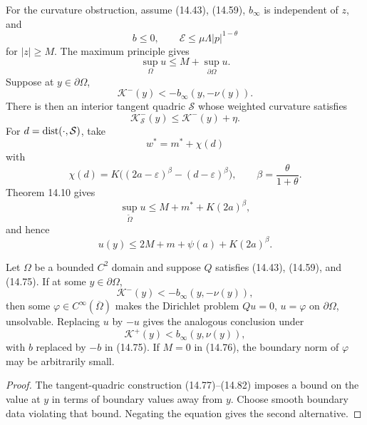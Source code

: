 For the curvature obstruction, assume (14.43), (14.59), $b_\infty$ is independent
of $z$, and
\begin{equation}
b\leq0,\qquad
\mathcal E\leq\mu\Lambda|p|^{1-\theta}
\tag{14.75}
\end{equation}
for $|z|\geq M$. The maximum principle gives
\begin{equation}
\sup_\Omega u\leq M+\sup_{\partial\Omega}u.
\tag{14.76}
\end{equation}
Suppose at $y\in\partial\Omega$,
\begin{equation}
\mathcal K^-(y)<-b_\infty(y,-\nu(y)).
\tag{14.77}
\end{equation}
There is then an interior tangent quadric $\mathcal S$ whose weighted curvature
satisfies
\begin{equation}
\mathcal K^-_{\mathcal S}(y)\leq\mathcal K^-(y)+\eta.
\tag{14.78}
\end{equation}
For $d=\operatorname{dist}(\cdot,\mathcal S)$, take
\begin{equation}
w^*=m^*+\chi(d)
\tag{14.79}
\end{equation}
with
\begin{equation}
\chi(d)=K\bigl((2a-\varepsilon)^\beta-(d-\varepsilon)^\beta\bigr),
\qquad\beta=\frac{\theta}{1+\theta}.
\tag{14.80}
\end{equation}
Theorem 14.10 gives
\begin{equation}
\sup_{\widetilde\Omega}u
\leq M+m^*+K(2a)^\beta,
\tag{14.81}
\end{equation}
and hence
\begin{equation}
u(y)\leq2M+m+\psi(a)+K(2a)^\beta.
\tag{14.82}
\end{equation}

\begin{theorem}
\label{gt14-boundary-gradient-14-12}
Let $\Omega$ be a bounded $C^2$ domain and suppose $Q$ satisfies
(14.43), (14.59), and (14.75). If at some $y\in\partial\Omega$,
\begin{equation}
\mathcal K^-(y)<-b_\infty(y,-\nu(y)),
\tag{14.83}
\end{equation}
then some $\varphi\in C^\infty(\overline\Omega)$ makes the Dirichlet problem
$Qu=0$, $u=\varphi$ on $\partial\Omega$, unsolvable. Replacing $u$ by $-u$
gives the analogous conclusion under
\begin{equation}
\mathcal K^+(y)<b_\infty(y,\nu(y)),
\tag{14.84}
\end{equation}
with $b$ replaced by $-b$ in (14.75). If $M=0$ in (14.76), the boundary
norm of $\varphi$ may be arbitrarily small.
\end{theorem}
\begin{proof}
\sketch The tangent-quadric construction (14.77)--(14.82) imposes a bound on
the value at $y$ in terms of boundary values away from $y$. Choose smooth
boundary data violating that bound. Negating the equation gives the second
alternative.
\end{proof}

